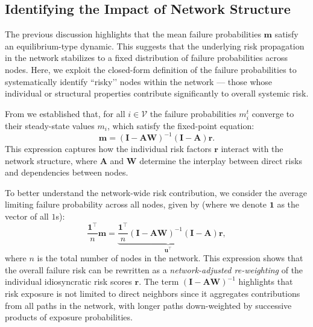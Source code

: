 \documentclass[mnsc,nonblindrev]{informs3}
\newcommand{\inv}{{-1}}
\newcommand{\rvec}{\mathbf{r}}
\newcommand{\A}{\mathbf{A}}
\newcommand{\W}{\mathbf{W}}
\newcommand{\I}{\mathbf{I}}
\newcommand{\uvec}{\mathbf{u}}
\newcommand{\mean}{m}
\newcommand{\meanvec}{\mathbf{\mean}}
\begin{document}
\subsection{Identifying the Impact of Network Structure}
\label{sec:page_rank}

The previous discussion highlights that the mean failure probabilities $\meanvec$ satisfy an equilibrium-type dynamic. This suggests that the underlying risk propagation in the network stabilizes to a fixed distribution of failure probabilities across nodes. Here, we exploit the closed-form definition of the failure probabilities to systematically identify ``risky’’ nodes within the network --- those whose individual or structural properties contribute significantly to overall systemic risk.

From  we established that, for all $i \in \mathcal{V}$ the failure probabilities \(\mean_i^t\) converge to their steady-state values \(\mean_i\), which satisfy the fixed-point equation:
\[
\meanvec = (\I-\A\W)^\inv(\I-\A)\rvec.
\]
This expression captures how the individual risk factors \(\rvec\) interact with the network structure, where \(\A\) and \(\W\) determine the interplay between direct risks and dependencies between nodes.

To better understand the network-wide risk contribution, we consider the average limiting failure probability across all nodes, given by (where we denote $\mathbf{1}$ as the vector of all $1$s):
\begin{equation}\label{eqn:gar_x}
\frac{\mathbf{1}^\top}{n} \meanvec = \underbrace{ \frac{\mathbf{1}^\top}{n}(\I-\A\W)^{-1}(\I-\A) }_{\uvec^\top} \rvec,
\end{equation}
where $n$ is the total number of nodes in the network. This expression shows that the overall failure risk can be rewritten as a {\em network-adjusted re-weighting} of the individual idiosyncratic risk scores \(\rvec\). The term $(\I - \A\W)^{-1}$ highlights that risk exposure is not limited to direct neighbors since it aggregates contributions from all paths in the network, with longer paths down-weighted by successive products of exposure probabilities.
\end{document}
